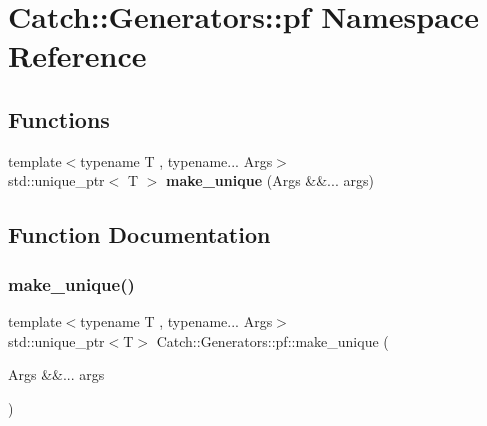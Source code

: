 \section{Catch\+::Generators\+::pf Namespace Reference}
\label{namespace_catch_1_1_generators_1_1pf}
\subsection*{Functions}
\begin{DoxyCompactItemize}
\item 
{\footnotesize template$<$typename T , typename... Args$>$ }\\std\+::unique\+\_\+ptr$<$ T $>$ \textbf{ make\+\_\+unique} (Args \&\&... args)
\end{DoxyCompactItemize}


\subsection{Function Documentation}
\mbox{\label{namespace_catch_1_1_generators_1_1pf_adb71cb1098062f6baaf86ec4feadae7d}} 
\subsubsection{make\_unique()}
{\footnotesize\ttfamily template$<$typename T , typename... Args$>$ \\
std\+::unique\+\_\+ptr$<$T$>$ Catch\+::\+Generators\+::pf\+::make\+\_\+unique (\begin{DoxyParamCaption}\item[{Args \&\&...}]{args }\end{DoxyParamCaption})}


